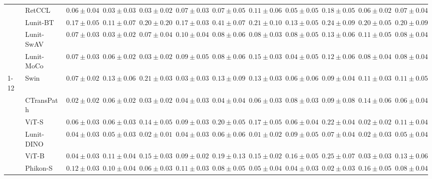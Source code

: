 \begin{tabular}{ll|cccc|c|cccc|c}
 & RetCCL~\cite{wang2023retccl} & $0.06 \pm 0.04$ & $0.03 \pm 0.03$ & $0.03 \pm 0.02$ & $0.07 \pm 0.03$ & $0.07 \pm 0.05$ & $0.11 \pm 0.06$ & $0.05 \pm 0.05$ & $0.18 \pm 0.05$ & $0.06 \pm 0.02$ & $0.07 \pm 0.04$ \\
 & Lunit-BT~\cite{kang2023benchmarking} & $0.17 \pm 0.05$ & $0.11 \pm 0.07$ & $0.20 \pm 0.20$ & $0.17 \pm 0.03$ & $0.41 \pm 0.07$ & $0.21 \pm 0.10$ & $0.13 \pm 0.05$ & $0.24 \pm 0.09$ & $0.20 \pm 0.05$ & $0.20 \pm 0.09$ \\
 & Lunit-SwAV~\cite{kang2023benchmarking} & $0.07 \pm 0.03$ & $0.03 \pm 0.02$ & $0.07 \pm 0.04$ & $0.10 \pm 0.04$ & $0.08 \pm 0.06$ & $0.08 \pm 0.03$ & $0.08 \pm 0.05$ & $0.13 \pm 0.06$ & $0.11 \pm 0.05$ & $0.08 \pm 0.04$ \\
 & Lunit-MoCo~\cite{kang2023benchmarking} & $0.07 \pm 0.03$ & $0.06 \pm 0.02$ & $0.03 \pm 0.02$ & $0.09 \pm 0.05$ & $0.08 \pm 0.06$ & $0.15 \pm 0.03$ & $\mathbf{0.04 \pm 0.05}$ & $0.12 \pm 0.06$ & $0.08 \pm 0.04$ & $0.08 \pm 0.04$ \\
\cline{1-12}
\multirow[t]{12}{*}{Transformer} & Swin~\cite{liu2021swin} & $0.07 \pm 0.02$ & $0.13 \pm 0.06$ & $0.21 \pm 0.03$ & $0.03 \pm 0.03$ & $0.13 \pm 0.09$ & $0.13 \pm 0.03$ & $0.06 \pm 0.06$ & $0.09 \pm 0.04$ & $0.11 \pm 0.03$ & $0.11 \pm 0.05$ \\
 & CTransPath~\cite{wang2022transformer} & $\mathbf{0.02 \pm 0.02}$ & $0.06 \pm 0.02$ & $0.03 \pm 0.02$ & $0.04 \pm 0.03$ & $\mathbf{0.04 \pm 0.04}$ & $0.06 \pm 0.03$ & $0.08 \pm 0.03$ & $0.09 \pm 0.08$ & $0.14 \pm 0.06$ & $0.06 \pm 0.04$ \\
 & ViT-S~\cite{kolesnikov2021image} & $0.06 \pm 0.03$ & $0.06 \pm 0.03$ & $0.14 \pm 0.05$ & $0.09 \pm 0.03$ & $0.20 \pm 0.05$ & $0.17 \pm 0.05$ & $0.06 \pm 0.04$ & $0.22 \pm 0.04$ & $\mathbf{0.02 \pm 0.02}$ & $0.11 \pm 0.04$ \\
 & Lunit-DINO~\cite{kang2023benchmarking} & $0.04 \pm 0.03$ & $0.05 \pm 0.03$ & $0.02 \pm 0.01$ & $0.04 \pm 0.03$ & $0.06 \pm 0.06$ & $\mathbf{0.01 \pm 0.02}$ & $0.09 \pm 0.05$ & $0.07 \pm 0.04$ & $0.02 \pm 0.03$ & $\mathbf{0.05 \pm 0.04}$ \\
 & ViT-B~\cite{kolesnikov2021image} & $0.04 \pm 0.03$ & $0.11 \pm 0.04$ & $0.15 \pm 0.03$ & $0.09 \pm 0.02$ & $0.19 \pm 0.13$ & $0.15 \pm 0.02$ & $0.16 \pm 0.05$ & $0.25 \pm 0.07$ & $0.03 \pm 0.03$ & $0.13 \pm 0.06$ \\
 & Phikon-S~\cite{filiot2023scaling} & $0.12 \pm 0.03$ & $0.10 \pm 0.04$ & $0.06 \pm 0.03$ & $0.11 \pm 0.03$ & $0.08 \pm 0.05$ & $0.05 \pm 0.04$ & $0.04 \pm 0.03$ & $\mathbf{0.02 \pm 0.03}$ & $0.16 \pm 0.05$ & $0.08 \pm 0.04$ \\

\end{tabular}
